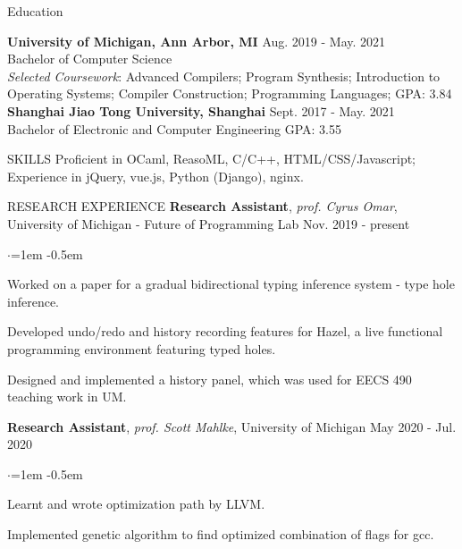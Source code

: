 \documentclass{resume} %
\newcommand{\rrsection}[5]{%
 {\textbf{#1}, }{\textit{#2},} {#3}\hfill{#4} \noindent
  \begin{list}{$\cdot$}{\leftmargin=1em}
   \itemsep -0.5em \vspace{-0.5em} 
  #5
  \end{list}
  \vspace{-0.5em} 
}
\begin{document}

\begin{rSection}{Education}

{\bf University of Michigan, Ann Arbor, MI} \hfill {Aug. 2019 - May. 2021} 
\\ Bachelor of Computer Science
\\ \textit{Selected Coursework}: Advanced Compilers; Program Synthesis; Introduction to Operating Systems; Compiler Construction; Programming Languages; 
 \hfill { GPA: 3.84}
\\{\bf Shanghai Jiao Tong University, Shanghai} \hfill {Sept. 2017 - May. 2021} 
\\Bachelor of Electronic and Computer Engineering 
 \hfill { GPA: 3.55}


\end{rSection}

\begin{rSection}{SKILLS}
Proficient in OCaml, ReasoML, C/C++, HTML/CSS/Javascript; Experience in jQuery, vue.js, Python (Django), nginx.
\end{rSection}
  
\begin{rSection}{RESEARCH EXPERIENCE}
\rrsection{Research Assistant}{prof. Cyrus Omar}{University of Michigan - Future of Programming Lab}{ Nov. 2019 - present}{
  \item Worked on a paper for a gradual bidirectional typing inference system - type hole inference. 
  \item Developed undo/redo and history recording features for Hazel, a live functional programming environment featuring typed holes.
  \item Designed and implemented a history panel, which was used for EECS 490 teaching work in UM. 
}
	
\rrsection{Research Assistant}{prof. Scott Mahlke}{University of Michigan}{ May 2020 - Jul. 2020}{
\item Learnt and wrote optimization path by LLVM.
  \item Implemented genetic algorithm to find optimized combination of flags for gcc.
}	
\end{rSection}
\end{document}
